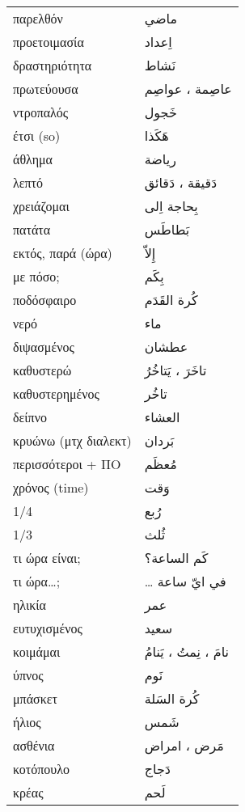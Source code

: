 \documentclass[twocolumn,a4paper]{article}
\newcommand{\ar}[1]{\textarabic{#1}}
\newcommand{\pl}{\raisebox{0.15ex}{\footnotesize ◍}}
\newcommand{\vrf}{\raisebox{0.15ex}{\footnotesize ◉}}
\newcommand{\vr}{\raisebox{0.15ex}{\footnotesize ◎}}
\newcommand{\mas}{\raisebox{0.15ex}{\footnotesize ◫}}
\begin{document}
\begin{mpsupertabular}{ P{0.5\textwidth} P{0.5\textwidth} }
παρελθόν       & \ar{ ماضي } \\
προετοιμασία   & \ar{ اِعداد } \\
δραστηριότητα  & \ar{ نَشاط  } \\
πρωτεύουσα \pl & \ar{ عاصِمة ، عواصِم } \\
ντροπαλός      & \ar{ خَجول } \\
έτσι (so)      & \ar{ هَكَذا } \\
άθλημα         & \ar{ رياضة } \\

λεπτό \pl                    & \ar{ دَقيقة ، دَقائق } \\
χρειάζομαι \vr               & \ar{ بِحاجة اِلى } \\
πατάτα                       & \ar{ بَطاطَس } \\
εκτός, παρά (ώρα)            & \ar{ إِلاّ } \\
με πόσο;                     & \ar{ بِكَم } \\

ποδόσφαιρο                   & \ar{ كُرة القَدَم } \\
νερό                         & \ar{ ماء } \\
διψασμένος                   & \ar{ عطشان } \\
καθυστερώ \vrf               & \ar{ تاخَرَ ، يَتاخُرُ } \\
καθυστερημένος \mas          & \ar{ تاخُر } \\
δείπνο                       & \ar{ العشاء } \\
κρυώνω (μτχ διαλεκτ)         & \ar{ بَردان } \\
περισσότεροι + ΠΟ            & \ar{ مُعظَم } \\
χρόνος (time)                & \ar{ وَقت } \\
1/4                          & \ar{ رُبع } \\
1/3                          & \ar{ ثُلث } \\
τι ώρα είναι;                & \ar{ كَم الساعة؟ } \\
τι ώρα\dots ;                & \dots \ar{ في ايّ ساعة } \\

ηλικία                       & \ar{ عمر } \\
ευτυχισμένος                 & \ar{ سعيد } \\
κοιμάμαι \vrf                & \ar{ نامَ ، نِمتُ ، يَنامُ } \\
ύπνος \mas                   & \ar{ نَوم } \\
μπάσκετ                      & \ar{ كُرة السَلة } \\
ήλιος                        & \ar{ شَمس } \\
ασθένια \pl                  & \ar{ مَرض ، امراض } \\
κοτόπουλο                    & \ar{ دَجاج } \\
κρέας                        & \ar{ لَحم } \\


\end{mpsupertabular}
\end{document}

